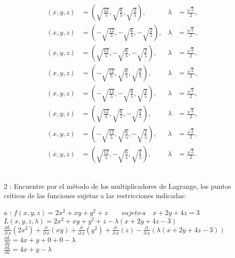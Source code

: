 \documentclass[13pt]{memoir}
\begin{document}
\begin{enumerate}
\begin{align*}
(x, y, z) &= \left( \sqrt{\frac{12}{5}}, \sqrt{\frac{6}{5}}, \sqrt{\frac{2}{5}} \right), & \lambda &= \frac{\sqrt{2}}{2}, \\
(x, y, z) &= \left( -\sqrt{\frac{12}{5}}, -\sqrt{\frac{6}{5}}, -\sqrt{\frac{2}{5}} \right), & \lambda &= \frac{\sqrt{2}}{2}, \\
(x, y, z) &= \left( \sqrt{\frac{12}{5}}, -\sqrt{\frac{6}{5}}, -\sqrt{\frac{2}{5}} \right), & \lambda &= \frac{\sqrt{2}}{2}, \\
(x, y, z) &= \left( -\sqrt{\frac{12}{5}}, \sqrt{\frac{6}{5}}, \sqrt{\frac{2}{5}} \right), & \lambda &= \frac{\sqrt{2}}{2}, \\
(x, y, z) &= \left( -\sqrt{\frac{12}{5}}, -\sqrt{\frac{6}{5}}, \sqrt{\frac{2}{5}} \right), & \lambda &= \frac{\sqrt{2}}{2}, \\
(x, y, z) &= \left( \sqrt{\frac{12}{5}}, \sqrt{\frac{6}{5}}, -\sqrt{\frac{2}{5}} \right), & \lambda &= \frac{\sqrt{2}}{2}, \\
(x, y, z) &= \left( -\sqrt{\frac{12}{5}}, \sqrt{\frac{6}{5}}, -\sqrt{\frac{2}{5}} \right), & \lambda &= \frac{\sqrt{2}}{2}, \\
(x, y, z) &= \left( \sqrt{\frac{12}{5}}, -\sqrt{\frac{6}{5}}, \sqrt{\frac{2}{5}} \right), & \lambda &= \frac{\sqrt{2}}{2}.
\end{align*}\\


\item[ 2]: Encuentre por el método de los multiplicadores de Lagrange, los puntos críticos de las funciones sujetas a las restricciones indicadas:\\

\item[ a]: $ f\left(x,y,z\right) = 2x^2+xy+y^2+z \qquad sujeto\:a \quad x+2y+4z=3 $ \\


$L(x, y, z, \lambda) = 2x^2 + xy + y^2 + z - \lambda(x + 2y + 4z - 3)$\\

$\frac{\partial L\:}{\partial \:x}\left(2x^2\right)+\frac{\partial \:}{\partial \:x}\left(xy\right)+\frac{\partial \:}{\partial \:x}\left(y^2\right)+\frac{\partial \:}{\partial \:x}\left(z\right)-\frac{\partial \:}{\partial \:x}\left(\lambda\left(x+2y+4z-3\right)\right)$\\
$\frac{\partial L}{\partial x} = 4x+y+0+0-\lambda$\\
$\frac{\partial L}{\partial x} = 4x + y - \lambda$\\


\end{enumerate}
\end{document}
